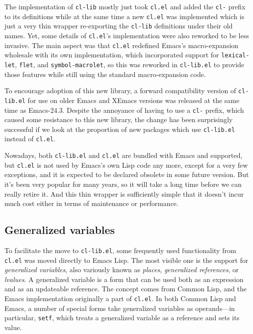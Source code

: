 \documentclass[format=acmsmall, review]{acmart}
\newcommand \Elisp {Emacs Lisp}
\begin{document}
The implementation of \texttt{cl-lib} mostly just took \texttt{cl.el} and
added the \texttt{cl-} prefix to its definitions while at the same time a new
\texttt{cl.el} was implemented which is just a very thin wrapper
re-exporting the \texttt{cl-lib} definitions under their old names.
Yet, some details of \texttt{cl.el}'s implementation were also
reworked to be less invasive.  The main aspect was that \texttt{cl.el}
redefined Emacs's macro-expansion wholesale with its own implementation,
which incorporated support for \texttt{lexical-let}, \texttt{flet}, and
\texttt{symbol-macrolet}, so this was reworked in \texttt{cl-lib.el} to
provide those features while still using the standard macro-expansion code.

To encourage adoption of this new library, a forward compatibility version
of \texttt{cl-lib.el} for use on older Emacs and XEmacs versions was
released at the same time as Emacs-24.3.  Despite the annoyance of having to
use a \texttt{cl-} prefix, which caused some resistance to this new library,
the change has been surprisingly successful if we look at the proportion of
new packages which use \texttt{cl-lib.el} instead of \texttt{cl.el}.

Nowadays, both \texttt{cl-lib.el} and \texttt{cl.el} are bundled with Emacs
and supported, but \texttt{cl.el} is not used by Emacs's own Lisp code any
more, except for a very few exceptions, and it is expected to be declared
obsolete in some future version.  But it's been very popular for many years,
so it will take a long time before we can really retire it.  And this thin
wrapper is sufficiently simple that it doesn't incur much cost either in
terms of maintenance or performance.

\subsection{Generalized variables} %
\label{sec:generalized-variables}

To facilitate the move to \texttt{cl-lib.el}, some frequently used
functionality from \texttt{cl.el} was moved directly to \Elisp{}.  The
most visible one is the support for \emph{generalized variables}, also
variously known as \emph{places}, \emph{generalized references}, or
\emph{lvalues}.  A generalized variable is a form that can be used both as
an expression and as an updateable reference.  The concept comes from
Common Lisp, and the Emacs implementation originally a part of
\texttt{cl.el}.  In both Common Lisp and Emacs, a number of special
forms take generalized variables as operands---in particular,
\texttt{setf}, which treats a generalized variable as a reference and
sets its value.
\end{document}
